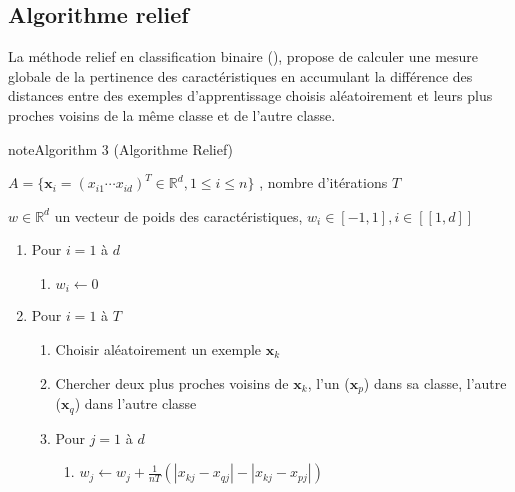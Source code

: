 \documentclass[letterpaper,10pt,english]{jupyterBook}
\begin{document}
\subsection{Algorithme relief}
\label{\detokenize{selection:algorithme-relief}}
\sphinxAtStartPar
La méthode relief en classification binaire ({\hyperref[\detokenize{selection:relief}]{}}), propose de calculer une mesure globale de la pertinence des caractéristiques en accumulant la différence des distances entre des exemples d’apprentissage choisis aléatoirement et leurs plus proches voisins de la même classe et de l’autre classe.
\label{selection:relief}
\begin{sphinxadmonition}{note}{Algorithm 3 (Algorithme Relief)}



\sphinxAtStartPar
{} \(A= \{\mathbf x_i=\left (x_{i1} \cdots x_{id} \right )^T\in\mathbb{R}^d,1\leq i\leq n  \}\) , nombre d’itérations \(T\)

\sphinxAtStartPar
{} \(w\in\mathbb{R}^d\) un vecteur de poids des caractéristiques, \(w_i\in[-1,1],i\in[\![1,d]\!]\)
\begin{enumerate}
%
\item {} 
\sphinxAtStartPar
Pour \(i=1\) à \( d\)
\begin{enumerate}
%
\item {} 
\sphinxAtStartPar
\(w_i\leftarrow 0\)

\end{enumerate}

\item {} 
\sphinxAtStartPar
Pour \(i=1\) à \( T\)
\begin{enumerate}
%
\item {} 
\sphinxAtStartPar
Choisir aléatoirement un exemple \(\mathbf x_k\)

\item {} 
\sphinxAtStartPar
Chercher deux plus proches voisins de \(\mathbf x_k\), l’un (\(\mathbf x_p\)) dans sa  classe, l’autre (\(\mathbf x_q\)) dans l’autre classe

\item {} 
\sphinxAtStartPar
Pour \(j=1\) à \(d\)
\begin{enumerate}
%
\item {} 
\sphinxAtStartPar
\(w_j\leftarrow w_j+\frac{1}{nT}\left (|x_{kj} -x_{qj}|-|x_{kj} -x_{pj}| \right )\)

\end{enumerate}

\end{enumerate}

\end{enumerate}
\end{sphinxadmonition}
\end{document}
